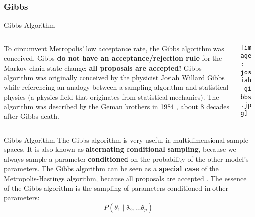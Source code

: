 \subsubsection{Gibbs}
\begin{frame}{Gibbs Algorithm}
	\begin{columns}
		\begin{column}{0.8\textwidth}
			To circumvent Metropolis' low acceptance rate, the Gibbs algorithm was conceived.
			Gibbs \textbf{do not have an acceptance/rejection rule} for the Markov chain state change:
			\textbf{all proposals are accepted!}
			\vfill
			Gibbs algorithm was originally conceived by the physicist Josiah Willard Gibbs
			while referencing an analogy between a sampling algorithm and
			statistical physics (a physics field that originates from statistical mechanics).
			The algorithm was described by the Geman brothers in 1984
			\parencite{gemanStochasticRelaxationGibbs1984},
			about 8 decades after Gibbs death.
		\end{column}
		\begin{column}{0.2\textwidth}
			\texttt{[image: josiah\_gibbs.jpg]}
		\end{column}
	\end{columns}
\end{frame}

\begin{frame}{Gibbs Algorithm}
	The Gibbs algorithm is very useful in multidimensional sample spaces.
	It is also known as \textbf{alternating conditional sampling},
	because we always sample a parameter \textbf{conditioned} on the probability of the other model's parameters.
	\vfill
	The Gibbs algorithm can be seen as a \textbf{special case} of the Metropolis-Hastings algorithm,
	because all proposals are accepted
	\parencite{gelmanIterativeNonIterativeSimulation1992}.
	\vfill
	The essence of the Gibbs algorithm is the sampling of parameters conditioned in other parameters:
	$$P(\theta_1 \mid \theta_2, \dots \theta_p)$$
\end{frame}

